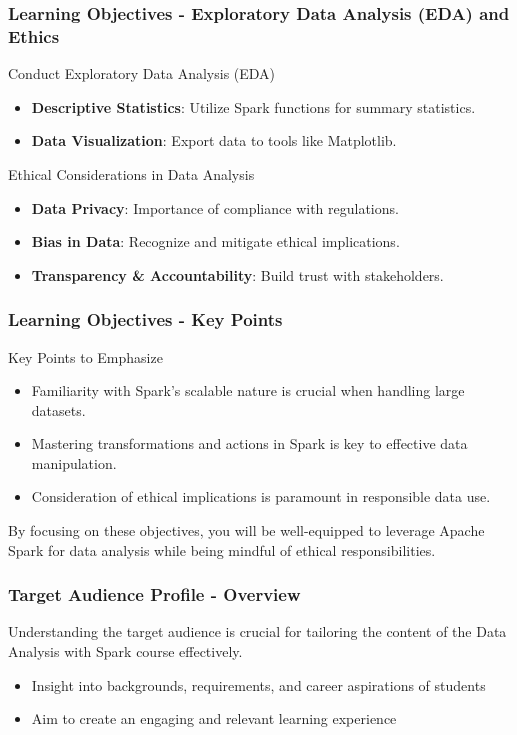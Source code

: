 \documentclass[aspectratio=169]{beamer}
\begin{document}
\begin{frame}[fragile]
    \frametitle{Learning Objectives - Exploratory Data Analysis (EDA) and Ethics}
    \begin{block}{Conduct Exploratory Data Analysis (EDA)}
        \begin{itemize}
            \item \textbf{Descriptive Statistics}: Utilize Spark functions for summary statistics.
            \item \textbf{Data Visualization}: Export data to tools like Matplotlib.
        \end{itemize}
    \end{block}
    \begin{block}{Ethical Considerations in Data Analysis}
        \begin{itemize}
            \item \textbf{Data Privacy}: Importance of compliance with regulations.
            \item \textbf{Bias in Data}: Recognize and mitigate ethical implications.
            \item \textbf{Transparency \& Accountability}: Build trust with stakeholders.
        \end{itemize}
    \end{block}
\end{frame}

\begin{frame}[fragile]
    \frametitle{Learning Objectives - Key Points}
    \begin{block}{Key Points to Emphasize}
        \begin{itemize}
            \item Familiarity with Spark’s scalable nature is crucial when handling large datasets.
            \item Mastering transformations and actions in Spark is key to effective data manipulation.
            \item Consideration of ethical implications is paramount in responsible data use.
        \end{itemize}
    \end{block}
    By focusing on these objectives, you will be well-equipped to leverage Apache Spark for data analysis while being mindful of ethical responsibilities.
\end{frame}

\begin{frame}[fragile]
    \frametitle{Target Audience Profile - Overview}
    Understanding the target audience is crucial for tailoring the content of the Data Analysis with Spark course effectively. 
    \begin{itemize}
        \item Insight into backgrounds, requirements, and career aspirations of students
        \item Aim to create an engaging and relevant learning experience
    \end{itemize}
\end{frame}
\end{document}
